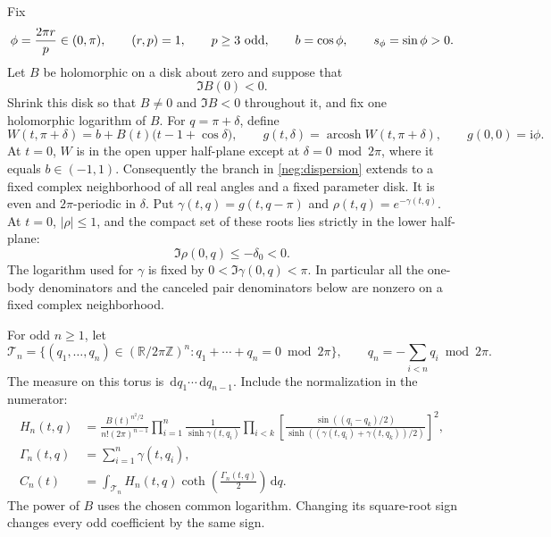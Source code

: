 \documentclass[11pt]{article}
\numberwithin{equation}{section}
\theoremstyle{definition}
\newcommand{\R}{\mathbb R}
\newcommand{\Z}{\mathbb Z}
\newcommand{\ii}{\mathrm i}
\newcommand{\dd}{\,\mathrm d}
\begin{document}
Fix
\begin{equation}
 \phi=\frac{2\pi r}{p}\in(0,\pi),\qquad
 (r,p)=1,\qquad p\ge3\ \hbox{odd},\qquad
 b=\cos\phi,\qquad s_\phi=\sin\phi>0 .
 \label{neg:rational}
\end{equation}
Let \(B\) be holomorphic on a disk about zero and suppose that
\begin{equation}
 \Im B(0)<0 .
 \label{neg:orientation}
\end{equation}
Shrink this disk so that \(B\ne0\) and \(\Im B<0\) throughout it, and
fix one holomorphic logarithm of \(B\).  For \(q=\pi+\delta\), define
\begin{equation}
 W(t,\pi+\delta)
   =b+B(t)\bigl(t-1+\cos\delta\bigr),\qquad
 g(t,\delta)=\operatorname{arcosh}W(t,\pi+\delta),\qquad
 g(0,0)=\ii\phi .
 \label{neg:dispersion}
\end{equation}
At \(t=0\), \(W\) is in the open upper half-plane except at
\(\delta=0\bmod 2\pi\), where it equals \(b\in(-1,1)\).  Consequently
the branch in \eqref{neg:dispersion} extends to a fixed complex
neighborhood of all real angles and a fixed parameter disk.  It is
even and \(2\pi\)-periodic in \(\delta\).  Put
\(\gamma(t,q)=g(t,q-\pi)\) and \(\rho(t,q)=e^{-\gamma(t,q)}\).
At \(t=0\), \(|\rho|\le1\), and the compact set of these roots lies
strictly in the lower half-plane:
\begin{equation}
 \Im\rho(0,q)\le-\delta_0<0 .
 \label{neg:root-compact}
\end{equation}
The logarithm used for \(\gamma\) is fixed by
\(0<\Im\gamma(0,q)<\pi\).  In particular all the one-body
denominators and the canceled pair denominators below are nonzero on
a fixed complex neighborhood.

For odd \(n\ge1\), let
\[
 \mathcal T_n=\{(q_1,\ldots,q_n)\in(\R/2\pi\Z)^n:
                         q_1+\cdots+q_n=0\bmod 2\pi\},
 \qquad q_n=-\sum_{i<n}q_i\bmod 2\pi .
 \]
The measure on this torus is \(\dd q_1\cdots\dd q_{n-1}\).  Include
the normalization in the numerator:
\begin{align}
 H_n(t,q)
 &=\frac{B(t)^{n^2/2}}{n!(2\pi)^{n-1}}
   \prod_{i=1}^n\frac1{\sinh\gamma(t,q_i)}
   \prod_{i<k}
   \left[
    \frac{\sin((q_i-q_k)/2)}
         {\sinh((\gamma(t,q_i)+\gamma(t,q_k))/2)}
   \right]^2 ,
 \label{neg:numerator}\\
 \Gamma_n(t,q)&=\sum_{i=1}^n\gamma(t,q_i),\\
 C_n(t)&=\int_{\mathcal T_n}H_n(t,q)
                          \coth\!\left(\frac{\Gamma_n(t,q)}2\right)
                          \dd q .
 \label{neg:coefficient}
\end{align}
The power of \(B\) uses the chosen common logarithm.  Changing its
square-root sign changes every odd coefficient by the same sign.
\end{document}
